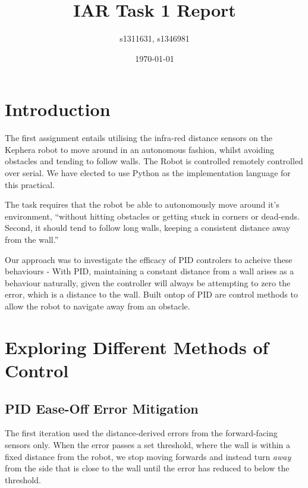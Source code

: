 \documentclass[11pt,a4wide]{article}
\begin{document}
\title{IAR Task 1 Report}
\author{s1311631, s1346981}
\date{\today}
\maketitle


\section{Introduction}

The first assignment entails utilising the infra-red distance sensors on the Kephera 
robot to move around in an autonomous fashion, whilst avoiding obstacles and tending 
to follow walls. The Robot is controlled remotely controlled over serial. We have 
elected to use Python as the implementation language for this practical.

The task requires that the robot be able to autonomously move around it's environment,
``without hitting obstacles or getting stuck in corners or dead-ends. Second, it should 
tend to follow long walls, keeping a consistent distance away from the wall.''

Our approach was to investigate the efficacy of PID controlers to acheive 
these behaviours - With PID, maintaining a constant distance from a wall arises as
a behaviour naturally, given the controller will always be attempting to zero the 
error, which is a distance to the wall. Built ontop of PID are control methods to
allow the robot to navigate away from an obstacle.


\section{Exploring Different Methods of Control}

\subsection{PID Ease-Off Error Mitigation}


The first iteration used the distance-derived errors from the forward-facing 
sensors only. When the error passes a set threshold, where the wall is within a 
fixed distance from the robot, we stop moving forwards and instead turn \emph{away} 
from the side that is close to the wall until the error has reduced to below the 
threshold.
\end{document}
